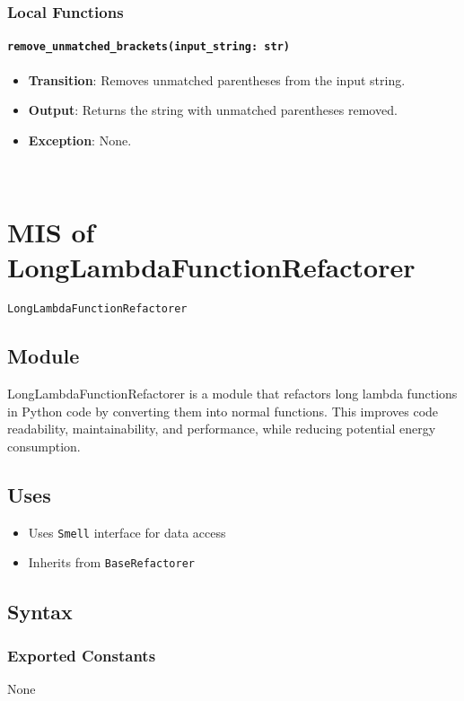 \documentclass[12pt, titlepage]{article}
\begin{document}
\subsubsection{Local Functions}
\paragraph{\texttt{remove\_unmatched\_brackets(input\_string: str)}}
\begin{itemize}
\item \textbf{Transition}: Removes unmatched parentheses from the input string.
\item \textbf{Output}: Returns the string with unmatched parentheses removed.
\item \textbf{Exception}: None.
\end{itemize}

~\newpage

\section{MIS of LongLambdaFunctionRefactorer} \label{mis:LLF}

\texttt{LongLambdaFunctionRefactorer}

\subsection{Module}
LongLambdaFunctionRefactorer is a module that refactors 
long lambda functions in Python code by converting them into normal functions. 
This improves code readability, maintainability, and performance, while reducing potential energy consumption.

\subsection{Uses}
\begin{itemize}
  \item Uses \texttt{Smell} interface for data access
  \item Inherits from \texttt{BaseRefactorer}
\end{itemize}

\subsection{Syntax}

\subsubsection{Exported Constants}
None
\end{document}
